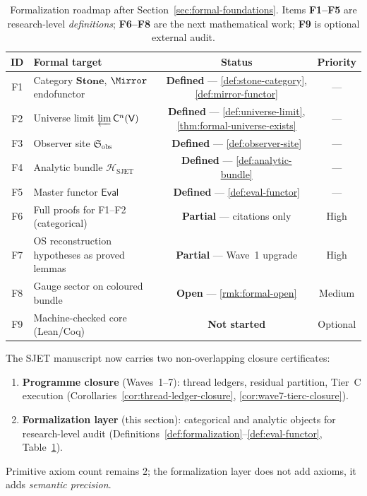 \begin{table}[ht]
\centering
\small
\renewcommand{\arraystretch}{1.10}
\begin{tabular}{@{}clcc@{}}
\toprule
\textbf{ID} & \textbf{Formal target} & \textbf{Status} & \textbf{Priority} \\
\midrule
F1 &
  Category $\mathbf{Stone}$, $\Mirror$ endofunctor &
  \textbf{Defined} --- \ref{def:stone-category}, \ref{def:mirror-functor} &
  --- \\
F2 &
  Universe limit $\varprojlim\mathsf{C}^n(\mathsf{V})$ &
  \textbf{Defined} --- \ref{def:universe-limit}, \ref{thm:formal-universe-exists} &
  --- \\
F3 &
  Observer site $\mathfrak{S}_{\mathrm{obs}}$ &
  \textbf{Defined} --- \ref{def:observer-site} &
  --- \\
F4 &
  Analytic bundle $\mathcal{H}_{\mathrm{SJET}}$ &
  \textbf{Defined} --- \ref{def:analytic-bundle} &
  --- \\
F5 &
  Master functor $\mathsf{Eval}$ &
  \textbf{Defined} --- \ref{def:eval-functor} &
  --- \\
F6 &
  Full proofs for F1--F2 (categorical) &
  \textbf{Partial} --- citations only &
  High \\
F7 &
  OS reconstruction hypotheses as proved lemmas &
  \textbf{Partial} --- Wave~1 upgrade &
  High \\
F8 &
  Gauge sector on coloured bundle &
  \textbf{Open} --- \ref{rmk:formal-open} &
  Medium \\
F9 &
  Machine-checked core (Lean/Coq) &
  \textbf{Not started} &
  Optional \\
\bottomrule
\end{tabular}
\caption{Formalization roadmap after Section~\ref{sec:formal-foundations}.
Items \textbf{F1--F5} are research-level \emph{definitions}; \textbf{F6--F8}
are the next mathematical work; \textbf{F9} is optional external audit.}
\label{tab:formal-roadmap}
\end{table}

\begin{corollary}
\label{cor:formalization-initiated}
The SJET manuscript now carries two non-overlapping closure certificates:
\begin{enumerate}[label=(\roman*),leftmargin=*]
  \item \textbf{Programme closure} (Waves~1--7): thread ledgers, residual
    partition, Tier~C execution
    (Corollaries~\ref{cor:thread-ledger-closure},
    \ref{cor:wave7-tierc-closure}).
  \item \textbf{Formalization layer} (this section): categorical and analytic
    objects for research-level audit
    (Definitions~\ref{def:formalization}--\ref{def:eval-functor},
    Table~\ref{tab:formal-roadmap}).
\end{enumerate}
Primitive axiom count remains $2$; the formalization layer does not add axioms,
it adds \emph{semantic precision}.
\end{corollary}